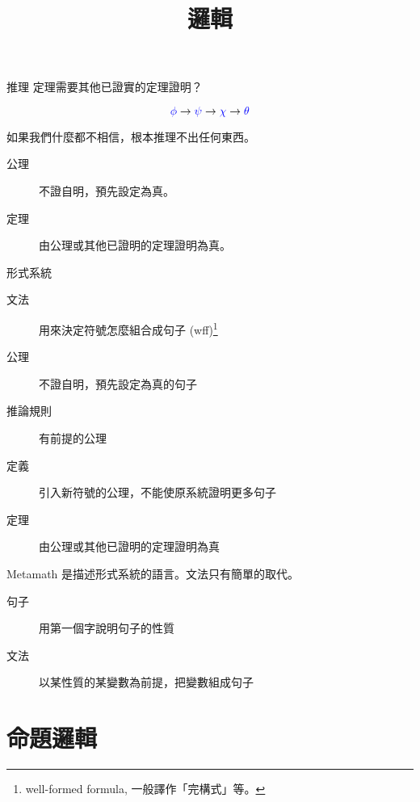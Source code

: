 \documentclass{Slideshow}
\begin{document}
\title[邏輯]{邏輯}
\maketitle

\begin{frame}{推理}
    定理需要其他已證實的定理證明？

    \[ {\color{blue}\phi} \to {\color{blue}\psi} \to {\color{blue}\chi} \to {\color{blue}\theta} \]

    如果我們什麼都不相信，根本推理不出任何東西。

    \begin{description}
        \item[公理] 不證自明，預先設定為真。
        \item[定理] 由公理或其他已證明的定理證明為真。
    \end{description}
\end{frame}

\begin{frame}{形式系統}
    \begin{description}
        \item[文法] 用來決定符號怎麼組合成句子 (wff)\footnote{well-formed
            formula, 一般譯作「完構式」等。}
        \item[公理] 不證自明，預先設定為真的句子
        \item[推論規則] 有前提的公理
        \item[定義] 引入新符號的公理，不能使原系統證明更多句子
        \item[定理] 由公理或其他已證明的定理證明為真
    \end{description}
\end{frame}

\begin{frame}{Metamath}
     是描述形式系統的語言。文法只有簡單的取代。

    \begin{description}
        \item[句子] 用第一個字說明句子的性質
        \item[文法] 以某性質的某變數為前提，把變數組成句子
    \end{description}
\end{frame}

\section{命題邏輯}
\newcommand{\wn}{\neg}
\newcommand{\wi}[2]{\left( #1 \to #2 \right)}
\newcommand{\wb}[2]{\left( #1 \leftrightarrow #2 \right)}
\newcommand{\wa}[2]{\left( #1 \wedge #2 \right)}
\newcommand{\wo}[2]{\left( #1 \vee #2 \right)}
\end{document}
